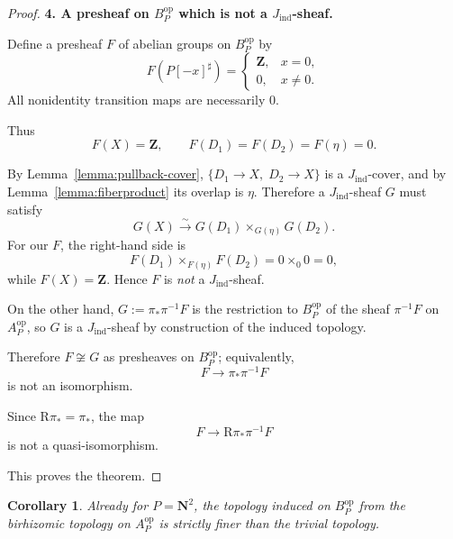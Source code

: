 \documentclass[11pt]{article}
\newtheorem{corollary}[theorem]{Corollary}
\begin{document}
\begin{proof}
\medskip
\noindent
\textbf{4. A presheaf on \(B_P^{\mathrm{op}}\) which is not a \(J_{\mathrm{ind}}\)-sheaf.}

Define a presheaf \(F\) of abelian groups on \(B_P^{\mathrm{op}}\) by
\[
F(P[-x]^\sharp)=
\begin{cases}
\mathbf Z,& x=0,\\
0,& x\neq 0.
\end{cases}
\]
All nonidentity transition maps are necessarily \(0\).

Thus
\[
F(X)=\mathbf Z,\qquad F(D_1)=F(D_2)=F(\eta)=0.
\]

By Lemma~\ref{lemma:pullback-cover}, \(\{D_1\to X,\;D_2\to X\}\) is a \(J_{\mathrm{ind}}\)-cover, and by Lemma~\ref{lemma:fiberproduct} its overlap is \(\eta\). Therefore a \(J_{\mathrm{ind}}\)-sheaf \(G\) must satisfy
\[
G(X)\xrightarrow{\sim} G(D_1)\times_{G(\eta)}G(D_2).
\]
For our \(F\), the right-hand side is
\[
F(D_1)\times_{F(\eta)}F(D_2)=0\times_0 0=0,
\]
while \(F(X)=\mathbf Z\). Hence \(F\) is \emph{not} a \(J_{\mathrm{ind}}\)-sheaf.

On the other hand, \(G:=\pi_\ast\pi^{-1}F\) is the restriction to \(B_P^{\mathrm{op}}\) of the sheaf \(\pi^{-1}F\) on \(A_P^{\mathrm{op}}\), so \(G\) is a \(J_{\mathrm{ind}}\)-sheaf by construction of the induced topology.

Therefore \(F\not\cong G\) as presheaves on \(B_P^{\mathrm{op}}\); equivalently,
\[
F \longrightarrow \pi_\ast\pi^{-1}F
\]
is not an isomorphism.

Since \(\mathrm R\pi_\ast=\pi_\ast\), the map
\[
F\longrightarrow \mathrm R\pi_\ast\pi^{-1}F
\]
is not a quasi-isomorphism.

This proves the theorem.
\end{proof}

\begin{corollary}
Already for \(P=\mathbf N^2\), the topology induced on \(B_P^{\mathrm{op}}\) from the birhizomic topology on \(A_P^{\mathrm{op}}\) is strictly finer than the trivial topology.
\end{corollary}
\end{document}
